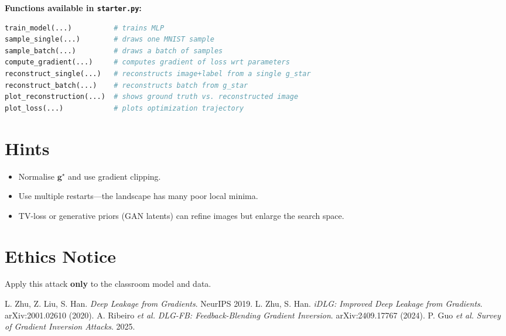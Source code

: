 \documentclass[12pt]{article}
\begin{document}
\textbf{Functions available in \texttt{starter.py}:}
\begin{lstlisting}[language=Python]
train_model(...)          # trains MLP
sample_single(...)        # draws one MNIST sample
sample_batch(...)         # draws a batch of samples
compute_gradient(...)     # computes gradient of loss wrt parameters
reconstruct_single(...)   # reconstructs image+label from a single g_star
reconstruct_batch(...)    # reconstructs batch from g_star
plot_reconstruction(...)  # shows ground truth vs. reconstructed image
plot_loss(...)            # plots optimization trajectory
\end{lstlisting}

\section*{Hints}
\begin{itemize}[nosep]
  \item Normalise \(\mathbf g^\star\) and use gradient clipping.
  \item Use multiple restarts—the landscape has many poor local minima.
  \item TV-loss or generative priors (GAN latents) can refine images but enlarge the search space.
\end{itemize}

\section*{Ethics Notice}
Apply this attack \textbf{only} to the classroom model and data.

\begin{thebibliography}{99}\small
{} L. Zhu, Z. Liu, S. Han. \emph{Deep Leakage from Gradients}. NeurIPS 2019.
 L. Zhu, S. Han. \emph{iDLG: Improved Deep Leakage from Gradients}. arXiv:2001.02610 (2020).
 A. Ribeiro \emph{et al.} \emph{DLG-FB: Feedback-Blending Gradient Inversion}. arXiv:2409.17767 (2024).
 P. Guo \emph{et al.} \emph{Survey of Gradient Inversion Attacks}. 2025.
\end{thebibliography}
\end{document}
